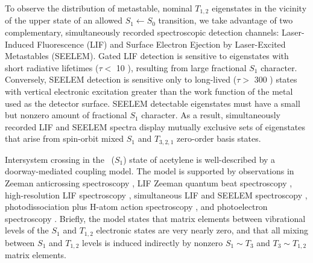 To observe the distribution of metastable, nominal $T_{1,2}$
eigenstates in the vicinity of the upper state of an allowed $S_1
\leftarrow S_0$ transition, we take advantage of two complementary,
simultaneously recorded spectroscopic detection channels:
Laser-Induced Fluorescence (LIF) and Surface Electron Ejection by
Laser-Excited Metastables (SEELEM).  Gated LIF detection is sensitive
to eigenstates with short radiative lifetimes ($\tau <$ 10 \microsec),
resulting from large fractional $S_1$ character.  Conversely, SEELEM
detection is sensitive only to long-lived ($\tau >$ 300 \microsec)
states with vertical electronic excitation greater than the work
function of the metal used as the detector surface.  SEELEM detectable
eigenstates must have a small but nonzero amount of fractional $S_1$
character.  As a result, simultaneously recorded LIF and SEELEM
spectra display mutually exclusive sets of eigenstates that arise from
spin-orbit mixed $S_1$ and $T_{3,2,1}$ zero-order basis states.

Intersystem crossing in the \astate\ ($S_1$) state of acetylene is
well-described by a doorway-mediated coupling model.  The model is
supported by observations in Zeeman anticrossing spectroscopy
\cite{dupre91, dupre95a, dupre95b}, LIF Zeeman quantum beat
spectroscopy \cite{ochi87, ochi91, dupre93}, high-resolution LIF
spectroscopy \cite{drabbels94, altunata01}, simultaneous LIF and
SEELEM spectroscopy \cite{humphrey97, altunata00, mishra04},
photodissociation plus H-atom action spectroscopy \cite{yamakita03,
  loffler98, mordaunt98}, and photoelectron spectroscopy
\cite{degroot07}.  Briefly, the model states that matrix elements
between vibrational levels of the $S_1$ and $T_{1,2}$ electronic
states are very nearly zero, and that all mixing between $S_1$ and
$T_{1,2}$ levels is induced indirectly by nonzero $S_1 \sim T_3$ and
$T_3 \sim T_{1,2}$ matrix elements.


